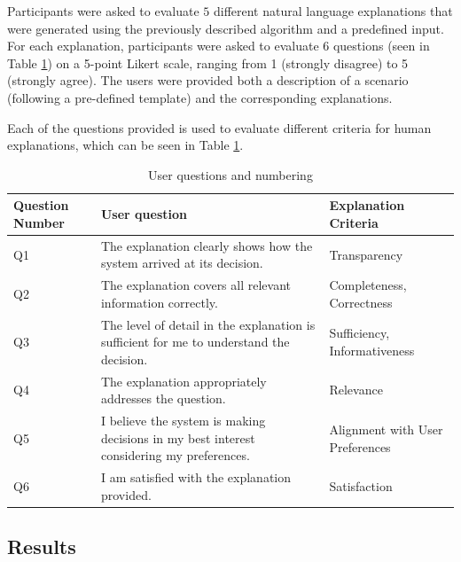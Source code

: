 \documentclass[sigconf,nonacm]{acmart}
\begin{document}
Participants were asked to evaluate $5$ different natural language explanations that were generated using the previously described algorithm and a predefined input. For each explanation, participants were asked to evaluate 6 questions (seen in Table \ref{tab:questions}) on a 5-point Likert scale, ranging from 1 (strongly disagree) to 5 (strongly agree). The users were provided both a description of a scenario (following a pre-defined template) and the corresponding explanations.

Each of the questions provided is used to evaluate different criteria for human explanations, which can be seen in Table \ref{tab:questions}.


\begin{table}[h]
    \centering
    \begin{tabularx}{\columnwidth}{p{1.2cm} X p{2cm}}
        \toprule
        \textbf{Question Number} & \textbf{User question} & \textbf{Explanation Criteria}\\
        \midrule
        Q1 & The explanation clearly shows how the system arrived at its decision. & Transparency \\
        Q2 & The explanation covers all relevant information correctly. & Completeness, Correctness\\
        Q3 & The level of detail in the explanation is sufficient for me to understand the decision. & Sufficiency, Informativeness \\
        Q4 & The explanation appropriately addresses the question. & Relevance \\
        Q5 & I believe the system is making decisions in my best interest considering my preferences. & Alignment with User Preferences\\
        Q6 & I am satisfied with the explanation provided. & Satisfaction \\
        \bottomrule
    \end{tabularx}
    \caption{User questions and numbering}
    \label{tab:questions}
\end{table}



\subsection{Results} \label{subsec:Results}
\end{document}
